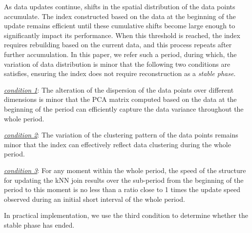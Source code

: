 As data updates continue, shifts in the spatial distribution of the data points accumulate. The \dualtree index constructed based on the data at the beginning of the update remains efficient until these cumulative shifts become large enough to significantly impact its performance. When this threshold is reached, the index requires rebuilding based on the current data, and this process repeats after further accumulation. In this paper, we refer such a period, during which, the variation of data distribution is minor that the following two conditions are satisfies, ensuring the \dualtree index does not require reconstruction as a \emph{stable phase}.

\noindent \underline{\textit{condition 1}}: The alteration of the dispersion of the data points over different dimensions is minor that the PCA matrix computed based on the data at the beginning of the period can efficiently capture the data variance throughout the whole period.

\noindent \underline{\textit{condition 2}}: The variation of the clustering pattern of the data points remains minor that the \dualtree index can effectively reflect data clustering during the whole period.

\noindent \underline{\textit{condition 3}}: For any moment within the whole period, the speed of the \dualtree structure for updating the kNN join results over the sub-period from the beginning of the period to this moment is no less than a ratio close to 1 times the update speed observed during an initial short interval of the whole period.

In practical implementation, we use the third condition to determine whether the stable phase has ended.

